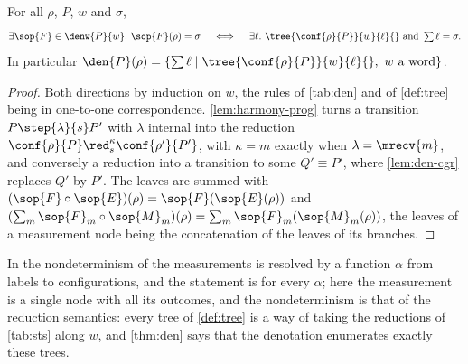 \begin{theorem}[Correspondence]\label{thm:den}
For all $\rho$, $P$, $w$ and $\sigma$,
\[
\exists \sop{F} \in \denw{P}{w}.\ \sop{F}(\rho) = \sigma
\quad\iff\quad
\exists \ell.\ \tree{\conf{\rho}{P}}{w}{\ell}{} \text{ and } \textstyle\sum \ell = \sigma .
\]
In particular $\den{P}(\rho) = \{ \sum \ell \mid \tree{\conf{\rho}{P}}{w}{\ell}{},\ w \text{ a word} \}$.
\end{theorem}

\begin{proof}
Both directions by induction on $w$, the rules of \cref{tab:den} and of
\cref{def:tree} being in one-to-one correspondence. \cref{lem:harmony-prog}
turns a transition $P \step{\lambda}{s} P'$ with $\lambda$ internal into the
reduction $\conf{\rho}{P} \red_{s}^{\kappa} \conf{\rho'}{P'}$, with
$\kappa = m$ exactly when $\lambda = \mrecv{m}$, and conversely a reduction
into a transition to some $Q' \equiv P'$, where \cref{lem:den-cgr} replaces
$Q'$ by $P'$. The leaves are summed with
$(\sop{F} \circ \sop{E})(\rho) = \sop{F}(\sop{E}(\rho))$ and
$(\sum_m \sop{F}_m \circ \sop{M}_m)(\rho) = \sum_m \sop{F}_m(\sop{M}_m(\rho))$,
the leaves of a measurement node being the concatenation of the leaves of its
branches.
\end{proof}

\begin{remark}
In \cite[Theorem 3.1]{UVY26} the nondeterminism of the measurements is
resolved by a function $\alpha$ from labels to configurations, and the
statement is for every $\alpha$; here the measurement is a single node with
all its outcomes, and the nondeterminism is that of the reduction semantics:
every tree of \cref{def:tree} is a way of taking the reductions of
\cref{tab:sts} along $w$, and \cref{thm:den} says that the denotation
enumerates exactly these trees.
\end{remark}
